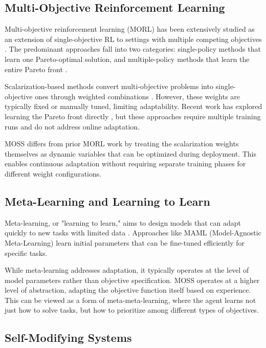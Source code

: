 \documentclass{article}
\begin{document}
\subsection{Multi-Objective Reinforcement Learning}

Multi-objective reinforcement learning (MORL) has been extensively studied as an extension of single-objective RL to settings with multiple competing objectives \cite{hayes2022practical}. The predominant approaches fall into two categories: single-policy methods that learn one Pareto-optimal solution, and multiple-policy methods that learn the entire Pareto front \cite{roijers2013survey}.

Scalarization-based methods convert multi-objective problems into single-objective ones through weighted combinations \cite{deb2014multi}. However, these weights are typically fixed or manually tuned, limiting adaptability. Recent work has explored learning the Pareto front directly \cite{lin2019pareto}, but these approaches require multiple training runs and do not address online adaptation.

MOSS differs from prior MORL work by treating the scalarization weights themselves as dynamic variables that can be optimized during deployment. This enables continuous adaptation without requiring separate training phases for different weight configurations.

\subsection{Meta-Learning and Learning to Learn}

Meta-learning, or "learning to learn," aims to design models that can adapt quickly to new tasks with limited data \cite{hospedales2021meta}. Approaches like MAML (Model-Agnostic Meta-Learning) \cite{finn2017model} learn initial parameters that can be fine-tuned efficiently for specific tasks.

While meta-learning addresses adaptation, it typically operates at the level of model parameters rather than objective specification. MOSS operates at a higher level of abstraction, adapting the objective function itself based on experience. This can be viewed as a form of meta-meta-learning, where the agent learns not just how to solve tasks, but how to prioritize among different types of objectives.

\subsection{Self-Modifying Systems}
\end{document}
